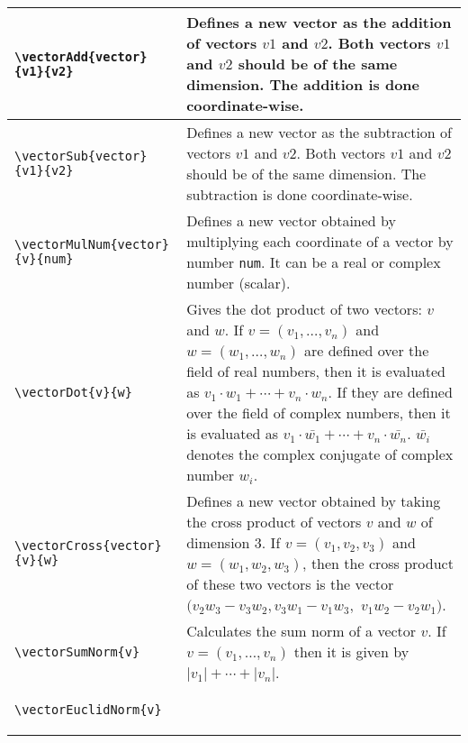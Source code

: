 \documentclass{article}
\begin{document}
\begin{longtable}{m{7cm}m{8.2cm}}
\begin{lstlisting}
\vectorAdd{vector}{v1}{v2}
\end{lstlisting}&
Defines a new vector as the addition of vectors \(v1\) and \(v2\). Both vectors \(v1\) and \(v2\) should be of the same dimension.  The addition is done coordinate-wise.\\
\midrule
 \begin{lstlisting}
\vectorSub{vector}{v1}{v2}
\end{lstlisting}&
Defines a new vector as the subtraction  of vectors \(v1\) and \(v2\). Both vectors \(v1\) and \(v2\) should be of the same dimension. The subtraction is done coordinate-wise. \\
\midrule
 \begin{lstlisting}
\vectorMulNum{vector}{v}{num}
\end{lstlisting}&
Defines a new vector obtained by multiplying each coordinate of a vector by number \verb|num|. It can be a real or complex number (scalar). \\
\midrule
\begin{lstlisting}
\vectorDot{v}{w}
\end{lstlisting}&
Gives the dot product of two vectors: \(v\) and \(w\). If  \(v=\left(v_1, \ldots, v_n \right)\) and \(w =\left(w_1, \ldots, w_n \right)\) are defined over the field of real numbers, then it is evaluated as \(v_1\cdot w_1 + \cdots + v_n \cdot w_n\).  If they are defined over the field of complex numbers, then it is evaluated as \(v_1\cdot \bar{w_1} + \cdots + v_n \cdot \bar{w_n}\). \(\bar{w_i}\) denotes the complex conjugate of complex number \(w_i\).  \\
\midrule
\begin{lstlisting}
\vectorCross{vector}{v}{w}
\end{lstlisting}&
Defines a new vector obtained by taking the cross product of vectors \(v\) and \(w\) of dimension 3.  If  \(v=\left(v_1, v_2, v_3 \right)\) and \(w =\left(w_1, w_2, w_3 \right)\), then the cross product of these two vectors is the vector \((v_2w_3-v_3w_2, v_3w_1-v_1w_3,\) \( v_1w_2-v_2w_1 ) \). \\
\midrule
 \begin{lstlisting}
\vectorSumNorm{v}
\end{lstlisting}&
Calculates the sum norm of a vector \(v\).  If \(v=\left(v_1, \ldots, v_n \right)\) then it is given by \(|v_1| + \cdots + |v_n|  \). \\
\midrule
 \begin{lstlisting}
\vectorEuclidNorm{v}

\end{lstlisting}
\end{longtable}
\end{document}
